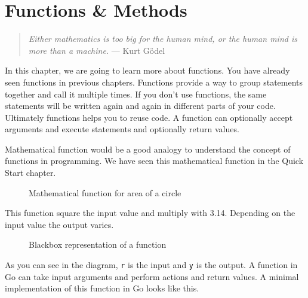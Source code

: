 \cleardoublepage
{}
\chapter{Functions \& Methods}

\begin{quote}
\textit{Either mathematics is too big for the human mind, or the human mind is
more than a machine.} --- Kurt Gödel
\end{quote}

In this chapter, we are going to learn more about functions.  You have
already seen functions in previous chapters.  Functions provide a way
to group statements together and call it multiple times.  If you don't
use functions, the same statements will be written again and again in
different parts of your code.  Ultimately functions helps you to reuse
code.  A function can optionally accept arguments and execute
statements and optionally return values.

Mathematical function would be a good analogy to understand the
concept of functions in programming.  We have seen this mathematical
function in the Quick Start chapter.

\begin{figure}[h!]
\centering
{}
\caption{Mathematical function for area of a circle}
\end{figure}

This function square the input value and multiply with 3.14.
Depending on the input value the output varies.

\begin{figure}[h!]
\centering
{}
\caption{Blackbox representation of a function}
\end{figure}

As you can see in the diagram, \texttt{r} is the input and \texttt{y}
is the output.  A function in Go can take input arguments and perform
actions and return values.  A minimal implementation of this function
in Go looks like this.

